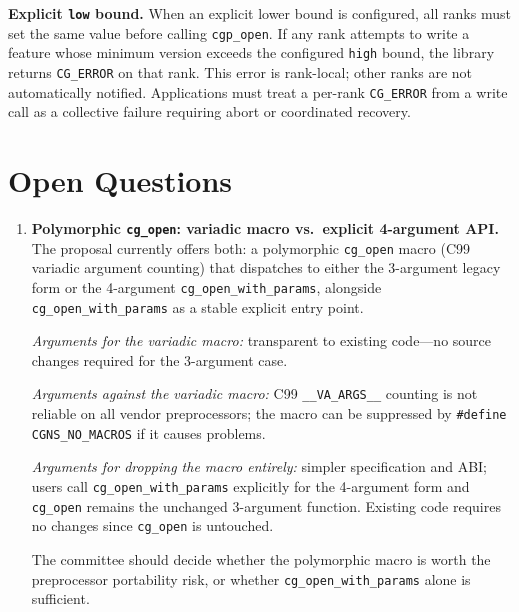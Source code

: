 \documentclass[11pt,letterpaper]{article}
\begin{document}
\textbf{Explicit \texttt{low} bound.}  When an explicit lower bound
is configured, all ranks must set the same value before calling
\texttt{cgp\_open}.  If any rank attempts to write a feature whose
minimum version exceeds the configured \texttt{high} bound, the
library returns \texttt{CG\_ERROR} on that rank.  This error is
rank-local; other ranks are not automatically notified.  Applications
must treat a per-rank \texttt{CG\_ERROR} from a write call as a
collective failure requiring abort or coordinated recovery.

\section{Open Questions}

\begin{enumerate}[leftmargin=2em]

\item \textbf{Polymorphic \texttt{cg\_open}: variadic macro vs.\
  explicit 4-argument API.}
  The proposal currently offers both: a polymorphic
  \texttt{cg\_open} macro (C99 variadic argument counting) that
  dispatches to either the 3-argument legacy form or the
  4-argument \texttt{cg\_open\_with\_params}, alongside
  \texttt{cg\_open\_with\_params} as a stable explicit entry point.

  \textit{Arguments for the variadic macro:} transparent to
  existing code---no source changes required for the 3-argument
  case.

  \textit{Arguments against the variadic macro:} C99
  \texttt{\_\_VA\_ARGS\_\_} counting is not reliable on all vendor
  preprocessors; the macro can be suppressed by
  \texttt{\#define CGNS\_NO\_MACROS} if it causes problems.

  \textit{Arguments for dropping the macro entirely:} simpler
  specification and ABI; users call \texttt{cg\_open\_with\_params}
  explicitly for the 4-argument form and \texttt{cg\_open}
  remains the unchanged 3-argument function.  Existing code
  requires no changes since \texttt{cg\_open} is untouched.

  The committee should decide whether the polymorphic macro is
  worth the preprocessor portability risk, or whether
  \texttt{cg\_open\_with\_params} alone is sufficient.

\end{enumerate}
\end{document}
